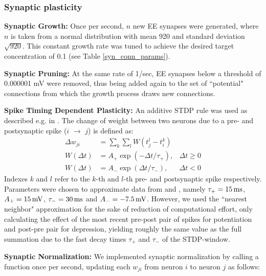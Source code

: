 \documentclass[10pt,letterpaper]{article}
\begin{document}
\subsubsection*{Synaptic plasticity}\label{Section_Methods_Syn_Plast}
\textbf{Synaptic Growth:} Once per second, $n$ new EE synapses were generated, where $n$ is taken from a normal distribution with mean 920 and standard deviation $\sqrt{920}$. This constant growth rate was tuned to achieve the desired target concentration of 0.1 (see Table \ref{syn_conn_params}).

\textbf{Synaptic Pruning:} At the same rate of 1/sec, EE synapses below a threshold of 0.000001 mV were removed, thus being added again to the set of ``potential" connections from which the growth process draws new connections.

\textbf{Spike Timing Dependent Plasticity:} An additive STDP rule was used as described e.g. in \cite{Zhang_STDP}. The change of weight between two neurons due to a pre- and postsynaptic spike ($i$ $\rightarrow$ $j$) is defined as:
\begin{align}
\Delta w_{ji} &= \sum_k \sum_l W(t_j^l - t_i^k) \label{STDP_rule} \\
W(\Delta t) &= A_{+} \exp(-\Delta t / \tau_{+}), & \Delta t \geq 0 \label{STDP_pos} \\
W(\Delta t) &= A_{-} \exp(\Delta t / \tau_{-}), & \Delta t < 0 \label{STDP_neg}
\end{align}
Indexes $k$ and $l$ refer to the $k$-th and $l$-th pre- and postsynaptic spike respectively. Parameters were chosen to approximate data from \cite{Bi_Poo_STDP} and \cite{Froemke_STDP}, namely $\tau_{+} = \rm 15\, ms$, $A_{+} =\rm 15\, mV$, $\tau_{-} =\rm 30\, ms$ and $A_{-} =\rm -7.5\, mV$. However, we used the ``nearest neighbor" approximation for the sake of reduction of computational effort, only calculating the effect of the most recent pre-post pair of spikes for potentiation and post-pre pair for depression, yielding roughly the same value as the full summation due to the fast decay times $\tau_{+}$ and $\tau_{-}$ of the STDP-window.

\textbf{Synaptic Normalization:} We implemented synaptic normalization by calling a function once per second, updating each $w_{ji}$ from neuron $i$ to neuron $j$ as follows:
\end{document}
